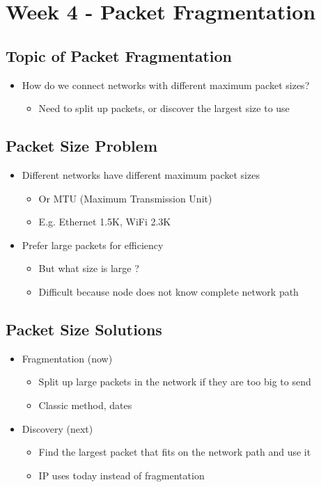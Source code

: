 \documentclass[12pt]{ctexart}   %
\begin{document}
\section{Week 4 - Packet Fragmentation}	
	\subsection{Topic of Packet Fragmentation}
	\begin{itemize}
		\item How do we connect networks with different maximum packet sizes?
		\begin{itemize}
			\item Need to split up packets, or discover the largest size to use
		\end{itemize}
	\end{itemize}
	
	\subsection{Packet Size Problem }
	\begin{itemize}
		\item Different networks have different maximum packet sizes
		\begin{itemize}
			\item Or MTU (Maximum Transmission Unit)
			\item E.g. Ethernet 1.5K, WiFi 2.3K
		\end{itemize}
		
		\item Prefer large packets for efficiency
		\begin{itemize}
			\item But what size is large ?
			\item Difficult because node does not know complete network path
		\end{itemize}
	\end{itemize}
	
	\subsection{Packet Size Solutions}
	\begin{itemize}
		\item Fragmentation (now)
		\begin{itemize}
			\item Split up large packets in the network if they are too big to send
			\item Classic method, dates
		\end{itemize}
		
		\item Discovery (next)
		\begin{itemize}
			\item Find the largest packet that fits on the network path and use it
			\item IP uses today instead of fragmentation
		\end{itemize}
	\end{itemize}
	
\end{document}

